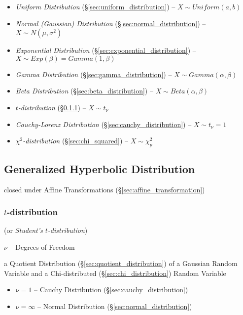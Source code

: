 \begin{itemize}
  \item \emph{Uniform Distribution} (\S\ref{sec:uniform_distribution}) --
    $X \sim Uniform(a,b)$
  \item \emph{Normal (Gaussian) Distribution} (\S\ref{sec:normal_distribution})
    -- $X \sim N(\mu, \sigma^2)$
  \item \emph{Exponential Distribution} (\S\ref{sec:exponential_distribution})
    -- $X \sim Exp(\beta) = Gamma(1, \beta)$
  \item \emph{Gamma Distribution} (\S\ref{sec:gamma_distribution})
    -- $X \sim Gamma(\alpha, \beta)$
  \item \emph{Beta Distribution} (\S\ref{sec:beta_distribution})
    -- $X \sim Beta(\alpha, \beta)$
  \item \emph{$t$-distribution} (\S\ref{sec:t_distribution})
    -- $X \sim t_\nu$
  \item \emph{Cauchy-Lorenz Distribution} (\S\ref{sec:cauchy_distribution})
    -- $X \sim t_\nu=1$
  \item \emph{$\chi^2$-distribution} (\S\ref{sec:chi_squared})
    -- $X \sim \chi^2_p$
\end{itemize}



\subsection{Generalized Hyperbolic Distribution}
\label{sec:generalized_hyperbolic}

closed under Affine Transformations (\S\ref{sec:affine_transformation})



\subsubsection{$t$-distribution}\label{sec:t_distribution}

(or \emph{Student's $t$-distribution})

$\nu$ -- Degrees of Freedom

a Quotient Distribution (\S\ref{sec:quotient_distribution}) of a Gaussian Random
Variable and a Chi-distributed (\S\ref{sec:chi_distribution}) Random Variable

\begin{itemize}
  \item $\nu = 1$ -- Cauchy Distribution (\S\ref{sec:cauchy_distribution})
  \item $\nu = \infty$ -- Normal Distribution (\S\ref{sec:normal_distribution})
\end{itemize}


